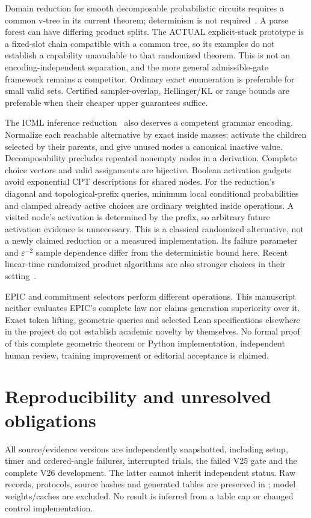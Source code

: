 \documentclass[11pt]{article}
\begin{document}
Domain reduction for smooth decomposable probabilistic circuits requires a
common v-tree in its current theorem; determinism is not required~\cite{domain}.
A parse forest can have differing product splits. The ACTUAL explicit-stack
prototype is a fixed-slot chain compatible with a common tree, so its examples
do not establish a capability unavailable to that randomized theorem. This is not
an encoding-independent separation, and the more general admissible-gate
framework remains a competitor. Ordinary exact enumeration is preferable
for small valid sets. Certified sampler-overlap, Hellinger/KL or range bounds are preferable
when their cheaper upper guarantees suffice.

The ICML inference reduction~\cite{inference} also deserves a competent grammar
encoding. Normalize each reachable alternative by exact inside masses; activate
the children selected by their parents, and give unused nodes a canonical
inactive value. Decomposability precludes repeated nonempty nodes in a
derivation. Complete choice vectors and valid assignments are bijective.
Boolean activation gadgets avoid exponential CPT descriptions for shared nodes.
For the reduction's diagonal and topological-prefix queries, minimum local
conditional probabilities and clamped already active choices are ordinary
weighted inside operations. A visited node's activation is determined by
the prefix, so arbitrary future activation evidence is unnecessary.
This is a classical randomized alternative, not a newly claimed reduction
or a measured implementation. Its failure parameter and $\varepsilon^{-2}$
sample dependence differ from the deterministic bound here. Recent linear-time
randomized product algorithms are also stronger choices in their setting~\cite{linear}.

EPIC and commitment selectors perform different operations. This manuscript
neither evaluates EPIC's complete law nor claims generation superiority over
it. Exact token lifting, geometric queries and selected Lean specifications
elsewhere in the project do not establish academic novelty by themselves.
No formal proof of this complete geometric theorem or Python implementation,
independent human review, training improvement or editorial acceptance is
claimed.

\section{Reproducibility and unresolved obligations}
All source/evidence versions are independently snapshotted, including setup,
timer and ordered-angle failures, interrupted trials, the failed V25 gate and
the complete V26 development. The latter cannot inherit independent status.
Raw records, protocols, source hashes and generated tables are preserved in
; model weights/caches are excluded.
No result is inferred from a table cap or changed control implementation.
\end{document}

